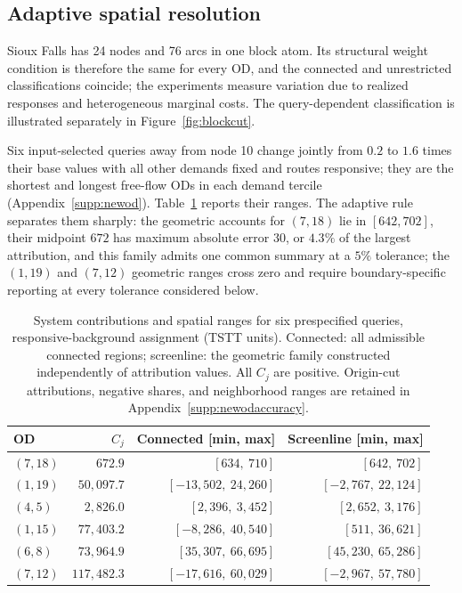 \subsection{Adaptive spatial resolution}\label{sec:adequate}
Sioux Falls has 24 nodes and 76 arcs in one block atom. Its structural weight condition is therefore the same for every OD, and the connected and unrestricted classifications coincide; the experiments measure variation due to realized responses and heterogeneous marginal costs. The query-dependent classification is illustrated separately in Figure~\ref{fig:blockcut}.

Six input-selected queries away from node 10 change jointly from $0.2$ to $1.6$ times their base values with all other demands fixed and routes responsive; they are the shortest and longest free-flow ODs in each demand tercile (Appendix~\ref{supp:newod}). Table~\ref{tab:newod} reports their ranges. The adaptive rule separates them sharply: the geometric accounts for $(7,18)$ lie in $[642,702]$, their midpoint $672$ has maximum absolute error $30$, or $4.3\%$ of the largest attribution, and this family admits one common summary at a $5\%$ tolerance; the $(1,19)$ and $(7,12)$ geometric ranges cross zero and require boundary-specific reporting at every tolerance considered below.
\begin{table}[pos=htbp]
\footnotesize
\caption{System contributions and spatial ranges for six prespecified queries,
responsive-background assignment (TSTT units). Connected: all admissible connected regions;
screenline: the geometric family constructed independently of attribution
values. All $C_j$ are positive. Origin-cut attributions, negative shares, and
neighborhood ranges are retained in Appendix~\ref{supp:newodaccuracy}.}
\label{tab:newod}
\small
\begin{tabular*}{\tblwidth}{@{\extracolsep{\fill}}lrrr}
\toprule
OD & $C_j$ & Connected [min, max] & Screenline [min, max]\\
\midrule
$(7,18)$ & $672.9$ & $[634{,}\ 710]$ & $[642{,}\ 702]$ \\
$(1,19)$ & $50{,}097.7$ & $[-13{,}502{,}\ 24{,}260]$ & $[-2{,}767{,}\ 22{,}124]$ \\
$(4,5)$ & $2{,}826.0$ & $[2{,}396{,}\ 3{,}452]$ & $[2{,}652{,}\ 3{,}176]$ \\
$(1,15)$ & $77{,}403.2$ & $[-8{,}286{,}\ 40{,}540]$ & $[511{,}\ 36{,}621]$ \\
$(6,8)$ & $73{,}964.9$ & $[35{,}307{,}\ 66{,}695]$ & $[45{,}230{,}\ 65{,}286]$ \\
$(7,12)$ & $117{,}482.3$ & $[-17{,}616{,}\ 60{,}029]$ & $[-2{,}967{,}\ 57{,}780]$ \\
\bottomrule
\end{tabular*}
\end{table}

